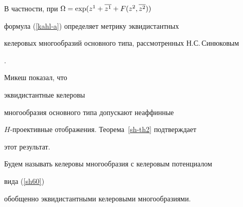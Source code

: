 В частности, при $\Omega =\exp (z^1+\overline{z^1}+F(z^2,\overline{z^2}))$


формула (\ref{kahl-a}) определяет метрику эквидистантных


келеровых многообразий основного типа, рассмотренных Н.С.\,Синюковым


\cite{sin1}.


Микеш \cite{mik-ekv} показал, что


эквидистантные келеровы


многообразия основного типа допускают неаффинные


$H$-проективные отображения. Теорема~\ref{sh-th2} подтверждает


этот результат.





Будем называть келеровы многообразия с келеровым потенциалом


вида (\ref{sh60})


обобщенно эквидистантными келеровыми многообразиями.





